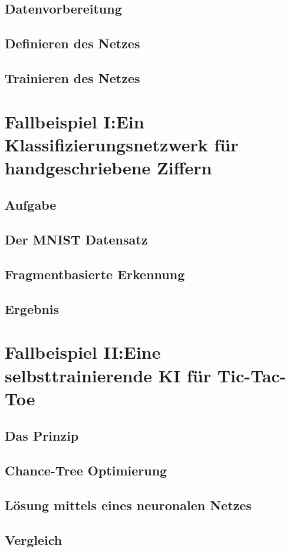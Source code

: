 \documentclass{article}
\begin{document}
\subsection{Datenvorbereitung}
\subsection{Definieren des Netzes}
\subsection{Trainieren des Netzes}
\section{Fallbeispiel I:\newline Ein Klassifizierungsnetzwerk für handgeschriebene Ziffern}
\subsection{Aufgabe}
\subsection{Der MNIST Datensatz}
\subsection{Fragmentbasierte Erkennung}
\subsection{Ergebnis}
\section{Fallbeispiel II:\newline Eine selbsttrainierende KI für Tic-Tac-Toe}
\subsection{Das Prinzip}
\subsection{Chance-Tree Optimierung}
\subsection{Lösung mittels eines neuronalen Netzes}
\subsection{Vergleich}
\end{document}
